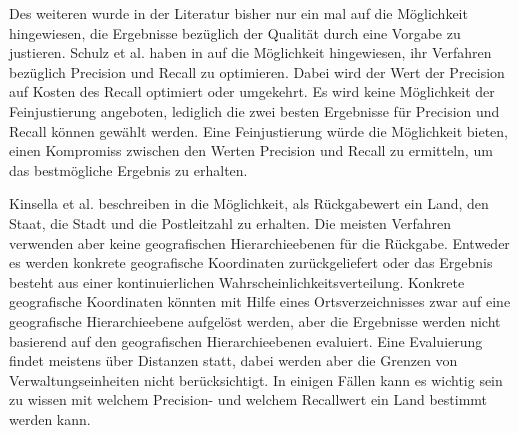 		Des weiteren wurde in der Literatur bisher nur ein mal auf die Möglichkeit hingewiesen, die Ergebnisse bezüglich der Qualität durch eine Vorgabe zu justieren.  
		Schulz et al. haben in \cite{Schulz2013} auf die Möglichkeit hingewiesen, ihr Verfahren bezüglich Precision und Recall zu optimieren.
		Dabei wird der Wert der Precision auf Kosten des Recall optimiert oder umgekehrt.
		Es wird keine Möglichkeit der Feinjustierung angeboten, lediglich die zwei besten Ergebnisse für Precision und Recall können gewählt werden.
		Eine Feinjustierung würde die Möglichkeit bieten, einen Kompromiss zwischen den Werten Precision und Recall zu ermitteln, um das bestmögliche Ergebnis zu erhalten.

		Kinsella et al. beschreiben in \cite{Kinsella2011} die Möglichkeit, als Rückgabewert ein Land, den Staat, die Stadt und die Postleitzahl zu erhalten.
		Die meisten Verfahren verwenden aber keine geografischen Hierarchieebenen für die Rückgabe. 
		Entweder es werden konkrete geografische Koordinaten zurückgeliefert oder das Ergebnis besteht aus einer kontinuierlichen Wahrscheinlichkeitsverteilung.
		Konkrete geografische Koordinaten könnten mit Hilfe eines Ortsverzeichnisses zwar auf eine geografische Hierarchieebene aufgelöst werden, aber die Ergebnisse werden nicht basierend auf den geografischen Hierarchieebenen evaluiert.
		Eine Evaluierung findet meistens über Distanzen statt, dabei werden aber die Grenzen von Verwaltungseinheiten nicht berücksichtigt. 
		In einigen Fällen kann es wichtig sein zu wissen mit welchem Precision- und welchem Recallwert ein Land bestimmt werden kann. 

